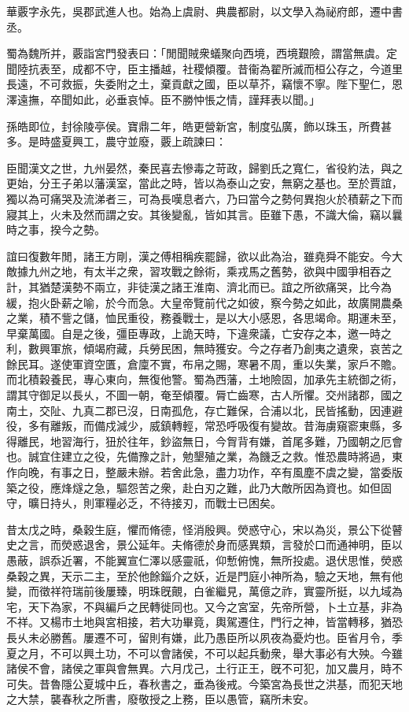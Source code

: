 
\begin{pinyinscope}
華覈字永先，吳郡武進人也。始為上虞尉、典農都尉，以文學入為祕府郎，遷中書丞。

蜀為魏所并，覈詣宮門發表曰：「閒聞賊衆蟻聚向西境，西境艱險，謂當無虞。定聞陸抗表至，成都不守，臣主播越，社稷傾覆。昔衞為翟所滅而桓公存之，今道里長遠，不可救振，失委附之土，棄貢獻之國，臣以草芥，竊懷不寧。陛下聖仁，恩澤遠撫，卒聞如此，必垂哀悼。臣不勝忡悵之情，謹拜表以聞。」

孫皓即位，封徐陵亭侯。寶鼎二年，皓更營新宮，制度弘廣，飾以珠玉，所費甚多。是時盛夏興工，農守並廢，覈上疏諫曰：

臣聞漢文之世，九州晏然，秦民喜去慘毒之苛政，歸劉氏之寬仁，省役約法，與之更始，分王子弟以藩漢室，當此之時，皆以為泰山之安，無窮之基也。至於賈誼，獨以為可痛哭及流涕者三，可為長嘆息者六，乃曰當今之勢何異抱火於積薪之下而寢其上，火未及然而謂之安。其後變亂，皆如其言。臣雖下愚，不識大倫，竊以曩時之事，揆今之勢。

誼曰復數年閒，諸王方剛，漢之傅相稱疾罷歸，欲以此為治，雖堯舜不能安。今大敵據九州之地，有太半之衆，習攻戰之餘術，乘戎馬之舊勢，欲與中國爭相吞之計，其猶楚漢勢不兩立，非徒漢之諸王淮南、濟北而已。誼之所欲痛哭，比今為緩，抱火卧薪之喻，於今而急。大皇帝覽前代之如彼，察今勢之如此，故廣開農桑之業，積不訾之儲，恤民重役，務養戰士，是以大小感恩，各思竭命。期運未至，早棄萬國。自是之後，彊臣專政，上詭天時，下違衆議，亡安存之本，邀一時之利，數興軍旅，傾竭府藏，兵勞民困，無時獲安。今之存者乃創夷之遺衆，哀苦之餘民耳。遂使軍資空匱，倉廩不實，布帛之賜，寒暑不周，重以失業，家戶不贍。而北積穀養民，專心東向，無復他警。蜀為西藩，土地險固，加承先主統御之術，謂其守御足以長乆，不圖一朝，奄至傾覆。脣亡齒寒，古人所懼。交州諸郡，國之南土，交阯、九真二郡已沒，日南孤危，存亡難保，合浦以北，民皆搖動，因連避役，多有離叛，而備戍減少，威鎮轉輕，常恐呼吸復有變故。昔海虜窺窬東縣，多得離民，地習海行，狃於往年，鈔盜無日，今胷背有嫌，首尾多難，乃國朝之厄會也。誠宜住建立之役，先備豫之計，勉墾殖之業，為饑乏之救。惟恐農時將過，東作向晚，有事之日，整嚴未辦。若舍此急，盡力功作，卒有風塵不虞之變，當委版築之役，應烽燧之急，驅怨苦之衆，赴白刃之難，此乃大敵所因為資也。如但固守，曠日持乆，則軍糧必乏，不待接刃，而戰士已困矣。

昔太戊之時，桑穀生庭，懼而脩德，怪消殷興。熒惑守心，宋以為災，景公下從瞽史之言，而熒惑退舍，景公延年。夫脩德於身而感異類，言發於口而通神明，臣以愚蔽，誤忝近署，不能翼宣仁澤以感靈祇，仰慙俯愧，無所投處。退伏思惟，熒惑桑穀之異，天示二主，至於他餘錙介之妖，近是門庭小神所為，驗之天地，無有他變，而徵祥符瑞前後屢臻，明珠旣覿，白雀繼見，萬億之祚，實靈所挺，以九域為宅，天下為家，不與編戶之民轉徙同也。又今之宮室，先帝所營，卜土立基，非為不祥。又楊市土地與宮相接，若大功畢竟，輿駕遷住，門行之神，皆當轉移，猶恐長乆未必勝舊。屢遷不可，留則有嫌，此乃愚臣所以夙夜為憂灼也。臣省月令，季夏之月，不可以興土功，不可以會諸侯，不可以起兵動衆，舉大事必有大殃。今雖諸侯不會，諸侯之軍與會無異。六月戊己，土行正王，旣不可犯，加又農月，時不可失。昔魯隱公夏城中丘，春秋書之，垂為後戒。今築宮為長世之洪基，而犯天地之大禁，襲春秋之所書，廢敬授之上務，臣以愚管，竊所未安。


\end{pinyinscope}
